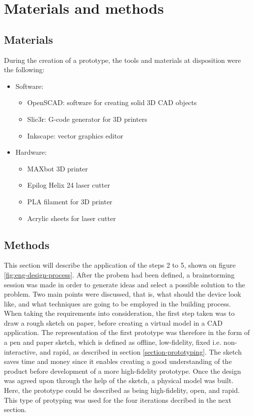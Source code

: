\clearpage

\section{Materials and methods}
\subsection{Materials}

During the creation of a prototype, the tools and materials at disposition were the following:

\begin{itemize}
	\item Software:
		\begin{itemize} \itemsep0em
	  		\item OpenSCAD: software for creating solid 3D CAD objects
  			\item Slic3r: G-code generator for 3D printers
  			\item Inkscape: vector graphics editor
		\end{itemize}

	\item Hardware:
		\begin{itemize} \itemsep0em
	  		\item MAXbot 3D printer
	  		\item Epilog Helix 24 laser cutter
	  		\item PLA filament for 3D printer
	  		\item Acrylic sheets for laser cutter
		\end{itemize}
\end{itemize}


\subsection{Methods}

This section will describe the application of the steps 2 to 5, shown on figure \ref{fig:eng-design-process}. After the probem had been defined, a brainstorming session was made in order to generate ideas and select a possible solution to the problem. Two main points were discussed, that is, what should the device look like, and what techniques are going to be employed in the building process. \\

When taking the requirements into consideration, the first step taken was to draw a rough sketch on paper, before creating a virtual model in a CAD application. The representation of the first prototype was therefore in the form of a pen and paper sketch, which is defined as offline, low-fidelity, fixed i.e. non-interactive, and rapid, as described in section \ref{section-prototyping}. The sketch saves time and money since it enables creating a good understanding of the product before development of a more high-fidelity prototype. Once the design was agreed upon through the help of the sketch, a physical model was built. Here, the prototype could be described as being high-fidelity, open, and rapid. This type of protyping was used for the four iterations decribed in the next section. \\

